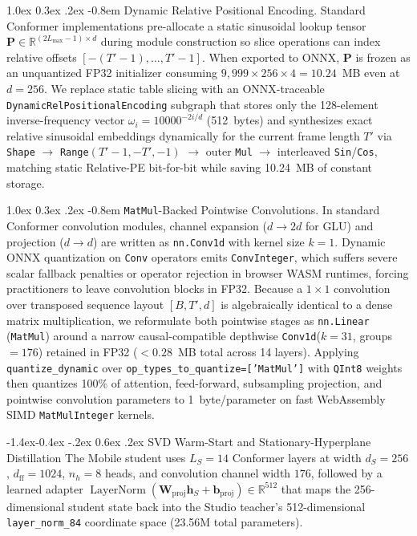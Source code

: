 \documentclass[10pt,twocolumn]{article}
\makeatletter
\renewcommand\subsection{\@startsection{subsection}{2}{\z@}%
  {-1.4ex\@plus -0.4ex \@minus -.2ex}%
  {0.6ex \@plus .2ex}%
  {\normalfont\normalsize\bfseries}}
\renewcommand\paragraph{\@startsection{paragraph}{4}{\z@}%
  {1.0ex \@plus0.3ex \@minus.2ex}%
  {-0.8em}%
  {\normalfont\normalsize\bfseries}}
\makeatother
\begin{document}
\paragraph{Dynamic Relative Positional Encoding.}
Standard Conformer implementations pre-allocate a static sinusoidal lookup tensor $\mathbf{P} \in \mathbb{R}^{(2 L_{\max} - 1) \times d}$ during module construction so slice operations can index relative offsets $[-(T'-1), \dots, T'-1]$. When exported to ONNX, $\mathbf{P}$ is frozen as an unquantized FP32 initializer consuming $9{,}999 \times 256 \times 4 = 10.24$~MB even at $d = 256$. We replace static table slicing with an ONNX-traceable \texttt{DynamicRelPositionalEncoding} subgraph that stores only the 128-element inverse-frequency vector $\omega_i = 10000^{-2i/d}$ (512~bytes) and synthesizes exact relative sinusoidal embeddings dynamically for the current frame length $T'$ via \texttt{Shape} $\to$ \texttt{Range}$(T'-1, -T', -1)$ $\to$ outer \texttt{Mul} $\to$ interleaved \texttt{Sin}/\texttt{Cos}, matching static Relative-PE bit-for-bit while saving 10.24~MB of constant storage.

\paragraph{\texttt{MatMul}-Backed Pointwise Convolutions.}
In standard Conformer convolution modules, channel expansion ($d \to 2d$ for GLU) and projection ($d \to d$) are written as \texttt{nn.Conv1d} with kernel size $k = 1$. Dynamic ONNX quantization on \texttt{Conv} operators emits \texttt{ConvInteger}, which suffers severe scalar fallback penalties or operator rejection in browser WASM runtimes, forcing practitioners to leave convolution blocks in FP32. Because a $1 \times 1$ convolution over transposed sequence layout $[B, T', d]$ is algebraically identical to a dense matrix multiplication, we reformulate both pointwise stages as \texttt{nn.Linear} (\texttt{MatMul}) around a narrow causal-compatible depthwise \texttt{Conv1d}($k = 31$, groups $= 176$) retained in FP32 ($< 0.28$~MB total across 14 layers). Applying \texttt{quantize\_dynamic} over \texttt{op\_types\_to\_quantize=['MatMul']} with \texttt{QInt8} weights then quantizes 100\% of attention, feed-forward, subsampling projection, and pointwise convolution parameters to 1~byte/parameter on fast WebAssembly SIMD \texttt{MatMulInteger} kernels.

\subsection{SVD Warm-Start and Stationary-Hyperplane Distillation}
The Mobile student uses $L_S = 14$ Conformer layers at width $d_S = 256$, $d_{\text{ff}} = 1024$, $n_h = 8$ heads, and convolution channel width $176$, followed by a learned adapter $\operatorname{LayerNorm}(\mathbf{W}_{\text{proj}} \mathbf{h}_S + \mathbf{b}_{\text{proj}}) \in \mathbb{R}^{512}$ that maps the 256-dimensional student state back into the Studio teacher's 512-dimensional \texttt{layer\_norm\_84} coordinate space (23.56M total parameters).
\end{document}
